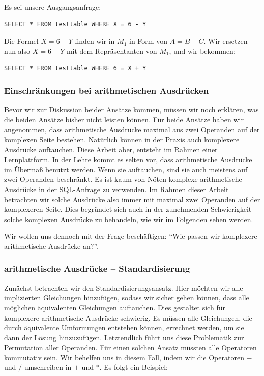 Es sei unsere Ausgangsanfrage: \begin{verbatim}SELECT * FROM testtable WHERE X = 6 - Y\end{verbatim}

Die Formel $X=6-Y$ finden wir in $M_1$ in Form von $A=B-C$. Wir ersetzen nun also $X=6-Y$ mit dem Repräsentanten von $M_1$, und wir bekommen: \begin{verbatim}SELECT * FROM testtable WHERE 6 = X + Y\end{verbatim}

\subsubsection{Einschränkungen bei arithmetischen Ausdrücken}
\label{subsubsec:arithmetic}

Bevor wir zur Diskussion beider Ansätze kommen, müssen wir noch erklären, was die beiden Ansätze bisher nicht leisten können. Für beide Ansätze haben wir angenommen, dass arithmetische Ausdrücke maximal aus zwei Operanden auf der komplexen Seite bestehen. Natürlich können in der Praxis auch komplexere Ausdrücke auftauchen. Diese Arbeit aber, entsteht im Rahmen einer Lernplattform. In der Lehre kommt es selten vor, dass arithmetische Ausdrücke im Übermaß benutzt werden. Wenn sie auftauchen, sind sie auch meistens auf zwei Operanden beschränkt. Es ist kaum von Nöten komplexe arithmetische Ausdrücke in der SQL-Anfrage zu verwenden. Im Rahmen dieser Arbeit betrachten wir solche Ausdrücke also immer mit maximal zwei Operanden auf der komplexeren Seite. Dies begründet sich auch in der zunehmenden Schwierigkeit solche komplexen Ausdrücke zu behandeln, wie wir im Folgenden sehen werden.

Wir wollen uns dennoch mit der Frage beschäftigen: ``Wie passen wir komplexere arithmetische Ausdrücke an?''. 

\subsubsection{arithmetische Ausdrücke -- Standardisierung}

Zunächst betrachten wir den Standardisierungsansatz. Hier möchten wir alle implizierten Gleichungen hinzufügen, sodass wir sicher gehen können, dass alle möglichen äquivalenten Gleichungen auftauchen. Dies gestaltet sich für komplexere arithmetische Ausdrücke schwierig. Es müssen alle Gleichungen, die durch äquivalente Umformungen entstehen können, errechnet werden, um sie dann der Lösung hinzuzufügen. Letztendlich führt uns diese Problematik zur Permutation aller Operanden. Für einen solchen Ansatz müssten alle Operatoren kommutativ sein. Wir behelfen uns in diesem Fall, indem wir die Operatoren $-$ und $/$ umschreiben in $+$ und $*$. Es folgt ein Beispiel:


